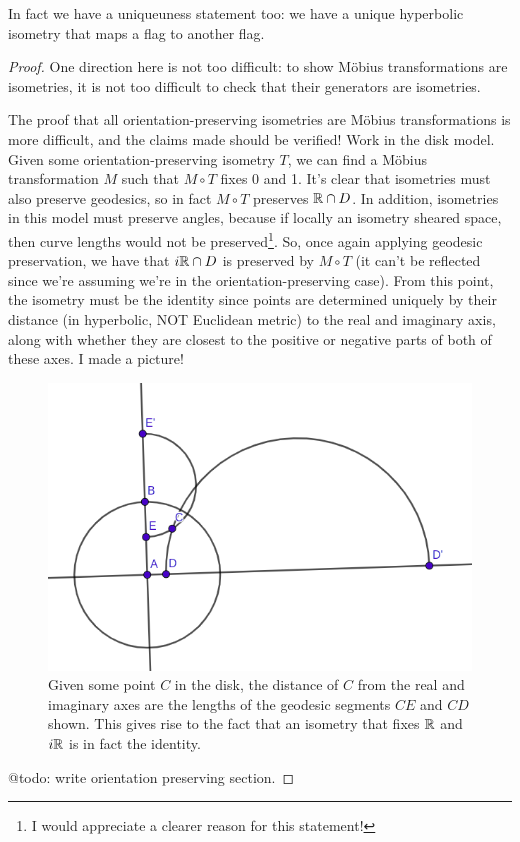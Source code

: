 \documentclass[11pt]{scrartcl}
\begin{document}
\begin{remark}
In fact we have a uniqueuness statement too: we have a unique hyperbolic isometry that maps a flag to another flag.
\end{remark}

\begin{proof}
One direction here is not too difficult: to show M{\"o}bius transformations are isometries, it is not too difficult to check that their generators are isometries.

The proof that all orientation-preserving isometries are M{\"o}bius transformations is more difficult, and the claims made should be verified! Work in the disk model. Given some orientation-preserving isometry $T$, we can find a M{\"o}bius transformation $M$ such that $M \circ T$ fixes 0 and 1. It's clear that isometries must also preserve geodesics, so in fact $M \circ T$ preserves $\mathbb R \cap D$. In addition, isometries in this model must preserve angles, because if locally an isometry sheared space, then curve lengths would not be preserved\footnote{I would appreciate a clearer reason for this statement!}. So, once again applying geodesic preservation, we have that $i \mathbb R \cap D$ is preserved by $M \circ T$ (it can't be reflected since we're assuming we're in the orientation-preserving case). From this point, the isometry must be the identity since points are determined uniquely by their distance (in hyperbolic, NOT Euclidean metric) to the real and imaginary axis, along with whether they are closest to the positive or negative parts of both of these axes. I made a picture!

\begin{figure}[h]
\centering
\includegraphics[scale=0.5]{Selection_199.png}
\caption{Given some point $C$ in the disk, the distance of $C$ from the real and imaginary axes are the lengths of the geodesic segments $CE$ and $CD$ shown. This gives rise to the fact that an isometry that fixes $\mathbb R$ and $i\mathbb R$ is in fact the identity.}
\label{fig:firstfig}
\end{figure}

@todo: write orientation preserving section.
\end{proof}
\end{document}

